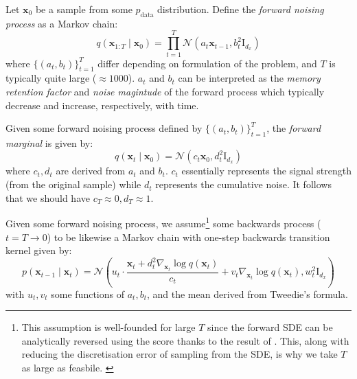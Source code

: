 \begin{definition}
    Let $\mathbf{x}_0$ be a sample from some $p_{\text{data}}$ distribution. Define the
    \emph{forward noising process} as a Markov chain:
    \begin{equation*}
    q(\mathbf{x}_{1:T} \mid \mathbf{x}_0) = \prod_{t=1}^T \mathcal{N}\left(a_t \mathbf{x}_{t-1}, b_t^2\mathrm{I}_{d_x}\right) \label{eq:fwd}
    \end{equation*}
    where $\{(a_t, b_t)\}_{t=1}^T$ differ depending on formulation of the problem, and $T$ is
    typically quite large ($\approx 1000$). $a_t$ and $b_t$ can be interpreted as the
    \emph{memory retention factor} and \emph{noise magintude} of the forward process which typically
    decrease and increase, respectively, with time.
\end{definition}

\begin{definition}
    Given some forward noising process defined by $\{(a_t, b_t)\}_{t=1}^T$, the
    \emph{forward marginal} is given by:
    $$
    q(\mathbf{x}_t \mid \mathbf{x}_0) = \mathcal{N}(c_t\mathbf{x}_0, d_t^2\mathrm{I}_{d_x})
    $$
    where $c_t, d_t$ are derived from $a_t$ and $b_t$. $c_t$ essentially represents the signal
    strength (from the original sample) while $d_t$ represents the cumulative noise. It follows that
    we should have $c_T \approx 0, d_T \approx 1$.
\end{definition}

\begin{definition} \label{defn:backwards-process}
    Given some forward noising process, we assume\footnote{This assumption is well-founded for
    large $T$ since the forward SDE can be analytically reversed using the score thanks to the
    result of \textcite{andersonReversetimeDiffusionEquation1982}. This, along with reducing the
    discretisation error of sampling from the SDE, is why we take $T$ as large as feasbile. \label{ftnt:sde-rep}}
    some backwards process ($t=T \to 0$) to be likewise a Markov chain with one-step backwards
    transition kernel given by:
    \begin{equation}
        p(\mathbf{x}_{t-1} \mid \mathbf{x}_t) = \mathcal{N}\left(u_t\cdot \frac{\mathbf{x}_t + d_t^2 \nabla_{\mathbf{x}_t}\log q(\mathbf{x}_t)}{c_t} + v_t\nabla_{\mathbf{x}_t}\log q(\mathbf{x}_t), w_t^2\mathrm{I}_{d_x}\right) \label{eq:backwards-process}
    \end{equation}
    with $u_t, v_t$ some functions of $a_t, b_t$, and the mean derived from Tweedie's formula.
\end{definition}

